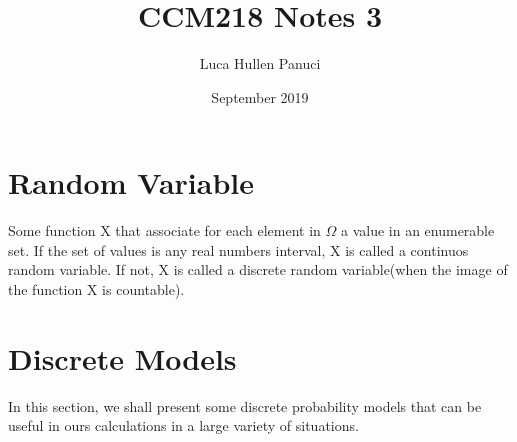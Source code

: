 \documentclass[oneside]{book}
\title{CCM218 Notes 3}
\author{Luca Hullen Panuci}
\date{September 2019}
\begin{document}
\maketitle

\section*{Random Variable}
Some function X that associate for each element in $\Omega$ a value in an enumerable set. If the set of values is any real numbers interval, X is called a continuos random variable. If not, X is called a discrete random variable(when the image of the function X is countable).
\section*{Discrete Models}

In this section, we shall present some discrete probability models that can be useful in ours calculations in a large variety of situations.
\end{document}
